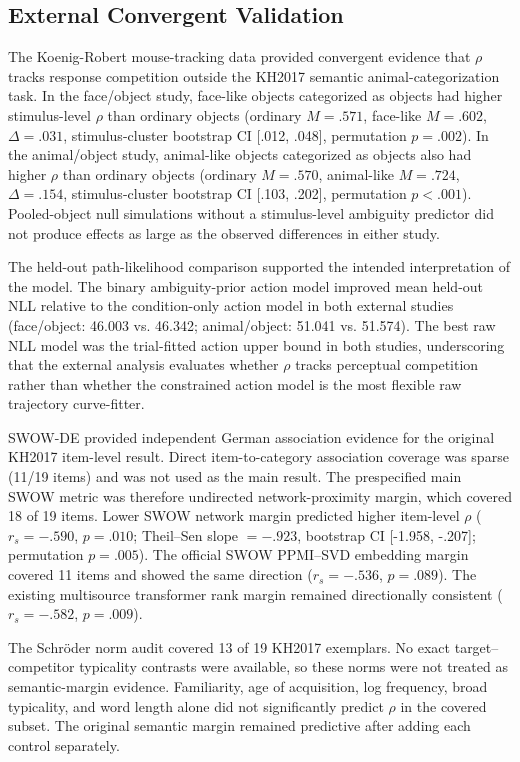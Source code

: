 
\subsection{External Convergent Validation}

The Koenig-Robert mouse-tracking data provided convergent evidence that $\rho$ tracks response competition outside the KH2017 semantic animal-categorization task. In the face/object study, face-like objects categorized as objects had higher stimulus-level $\rho$ than ordinary objects (ordinary $M=.571$, face-like $M=.602$, $\Delta=.031$, stimulus-cluster bootstrap CI [.012, .048], permutation $p=.002$). In the animal/object study, animal-like objects categorized as objects also had higher $\rho$ than ordinary objects (ordinary $M=.570$, animal-like $M=.724$, $\Delta=.154$, stimulus-cluster bootstrap CI [.103, .202], permutation $p<.001$). Pooled-object null simulations without a stimulus-level ambiguity predictor did not produce effects as large as the observed differences in either study.

The held-out path-likelihood comparison supported the intended interpretation of the model. The binary ambiguity-prior action model improved mean held-out NLL relative to the condition-only action model in both external studies (face/object: 46.003 vs. 46.342; animal/object: 51.041 vs. 51.574). The best raw NLL model was the trial-fitted action upper bound in both studies, underscoring that the external analysis evaluates whether $\rho$ tracks perceptual competition rather than whether the constrained action model is the most flexible raw trajectory curve-fitter.

SWOW-DE provided independent German association evidence for the original KH2017 item-level result. Direct item-to-category association coverage was sparse (11/19 items) and was not used as the main result. The prespecified main SWOW metric was therefore undirected network-proximity margin, which covered 18 of 19 items. Lower SWOW network margin predicted higher item-level $\rho$ ($r_s=-.590$, $p=.010$; Theil--Sen slope $=-.923$, bootstrap CI [-1.958, -.207]; permutation $p=.005$). The official SWOW PPMI--SVD embedding margin covered 11 items and showed the same direction ($r_s=-.536$, $p=.089$). The existing multisource transformer rank margin remained directionally consistent ($r_s=-.582$, $p=.009$).

The Schröder norm audit covered 13 of 19 KH2017 exemplars. No exact target--competitor typicality contrasts were available, so these norms were not treated as semantic-margin evidence. Familiarity, age of acquisition, log frequency, broad typicality, and word length alone did not significantly predict $\rho$ in the covered subset. The original semantic margin remained predictive after adding each control separately.
